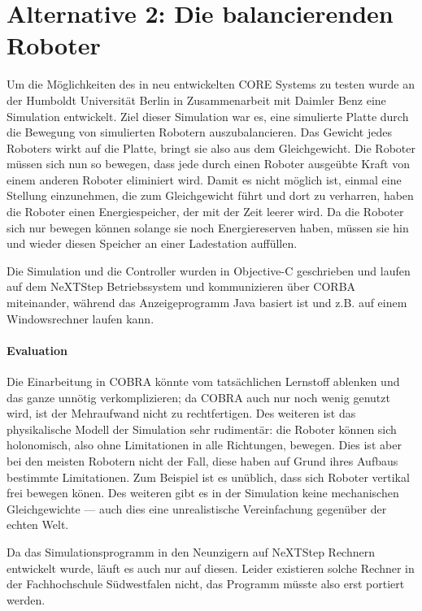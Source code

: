 \clearpage
\section{Alternative 2: Die balancierenden Roboter}
Um die M{\"{o}}glichkeiten des in \cite{Werner00} neu entwickelten CORE Systems zu testen wurde an der Humboldt Universit{\"{a}}t Berlin in Zusammenarbeit
mit Daimler Benz eine Simulation entwickelt. Ziel dieser Simulation war es, eine simulierte Platte durch die Bewegung von simulierten
Robotern auszubalancieren. Das Gewicht jedes Roboters wirkt auf die Platte, bringt sie also aus dem Gleichgewicht. Die Roboter m{\"{u}}ssen sich nun so
bewegen, dass jede durch einen Roboter ausge{\"{u}}bte Kraft von einem anderen Roboter eliminiert wird. Damit es nicht m{\"{o}}glich ist, einmal eine Stellung einzunehmen,
die zum Gleichgewicht f{\"{u}}hrt und dort zu verharren, haben die Roboter einen Energiespeicher, der mit der Zeit leerer wird. Da die Roboter sich nur bewegen k{\"{o}}nnen
solange sie noch Energiereserven haben, m{\"{u}}ssen sie hin und wieder diesen Speicher an einer Ladestation auff{\"{u}}llen.

Die Simulation und die Controller wurden in Objective-C geschrieben und laufen auf dem NeXTStep Betriebssystem und kommunizieren {\"{u}}ber CORBA miteinander\cite{predictablecorba},
w{\"{a}}hrend das Anzeigeprogramm Java basiert ist und z.B. auf einem Windowsrechner laufen kann.

\paragraph{Evaluation} Die Einarbeitung in COBRA k{\"{o}}nnte vom tats{\"{a}}chlichen Lernstoff ablenken und das ganze unn{\"{o}}tig verkomplizieren; da COBRA auch nur noch
wenig genutzt wird, ist der Mehraufwand nicht zu rechtfertigen. Des weiteren ist das physikalische Modell der Simulation sehr rudiment{\"{a}}r:
die Roboter k{\"{o}}nnen sich holonomisch, also ohne Limitationen in alle Richtungen, bewegen. Dies ist aber bei den meisten Robotern nicht
der Fall, diese haben auf Grund ihres Aufbaus bestimmte Limitationen. Zum Beispiel ist es un{\"{u}}blich, dass sich Roboter vertikal frei bewegen k{\"{o}}nen. Des weiteren
gibt es in der Simulation keine mechanischen Gleichgewichte --- auch dies eine unrealistische Vereinfachung gegen{\"{u}}ber der echten Welt.

Da das Simulationsprogramm in den Neunzigern auf NeXTStep Rechnern entwickelt wurde, l{\"{a}}uft es auch nur auf diesen. Leider existieren solche Rechner in der Fachhochschule
S{\"{u}}dwestfalen nicht, das Programm m{\"{u}}sste also erst portiert werden.

